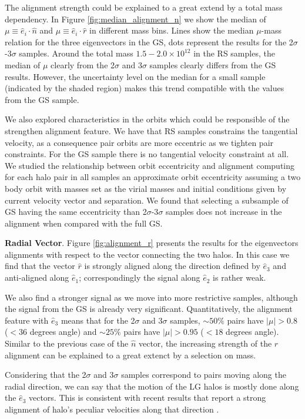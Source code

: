 \documentclass{emulateapj}
\newcommand{\msun}{{\ifmmode{{\rm {M_{\odot}}}}\else{${\rm{M_{\odot}}}$}\fi}}
\begin{document}
The alignment strength could be explained to a great extend by 
a total mass dependency. In Figure \ref{fig:median_alignment_n} we
show the median of $\mu\equiv\hat{e}_i\cdot\hat{n}$ and $\mu\equiv
\hat{e}_i\cdot\hat{r}$ in different mass bins. 
Lines show the median $\mu$-mass relation for the three
eigenvectors in the GS, dots represent the results for the
2$\sigma$-3$\sigma$ samples.  Around the total mass $1.5-2.0 \times
10^{12}$ \msun in the RS samples, the median of $\mu$ clearly from the
2$\sigma$ and 3$\sigma$ samples clearly differs from the GS
results. However, the uncertainty level on the median for a small
sample (indicated by the shaded region) makes this trend compatible
with the values from the GS sample.


We also explored characteristics in the orbits which could be
responsible of the strengthen alignment feature. We  
have that RS samples constrains the tangential velocity, as a
consequence pair orbits are more eccentric as we tighten pair
constraints. For the GS sample there is no tangential velocity
constraint at all.
We studied the relationship between orbit eccentricity and alignment
computing for each halo pair in all samples an approximate orbit 
eccentricity assuming a two body orbit with masses set as the virial 
masses and initial conditions given by current velocity vector and separation.
We found that  selecting a subsample of GS having the same eccentricity than 
2$\sigma$-3$\sigma$ samples does not increase in the alignment when
compared with the full GS. 


{\bf Radial Vector}.  Figure \ref{fig:alignment_r} presents the
results for the eigenvectors alignments with respect to the vector
connecting the two halos. 
In this case we find that the vector $\hat{r}$
is strongly aligned along the direction defined by
$\hat{e}_3$ and anti-aligned along $\hat{e}_1$; correspondingly the
signal along $\hat{e}_2$ is rather weak. 

We also find a stronger signal as we move into more restrictive
samples, although the signal from the GS is already very
significant. 
Quantitatively, the alignment feature with $\hat{e}_3$
means that for the 2$\sigma$ and 3$\sigma$ samples, $\sim 50\%$ pairs
have $|\mu|>0.8$ ($<36$ degrees angle) and $\sim 25\%$ pairs have
$|\mu|>0.95$ ($<18$ degrees angle). Similar to the previous case of
the $\hat{n}$ vector, the increasing strength of the
$\hat{r}$ alignment can be explained to a great extenct by a selection
on mass.  

Considering that the 2$\sigma$ and 3$\sigma$ samples correspond to
pairs moving along the radial direction, we can say that the
motion of the LG halos is mostly done along the $\hat{e}_3$
vectors. This is consistent with recent results that report a strong
alignment of halo's peculiar velocities along that direction
\citep{ForeroRomero2014}. 
\end{document}

